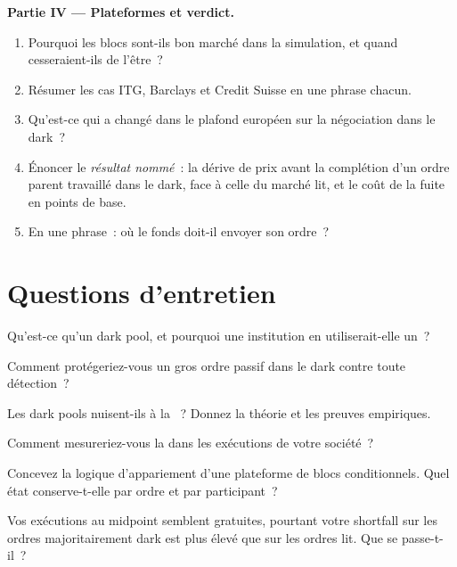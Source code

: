 \begin{problem}
\medskip\noindent\textbf{Partie IV --- Plateformes et verdict.}
\begin{enumerate}[resume]
\item Pourquoi les blocs sont-ils bon marché dans la simulation, et quand cesseraient-ils de l'être~?
\item Résumer les cas ITG, Barclays et Credit Suisse en une phrase chacun.
\item Qu'est-ce qui a changé dans le plafond européen sur la négociation dans le dark~?
\item Énoncer le \emph{résultat nommé}~: la dérive de prix avant la complétion d'un ordre parent travaillé dans le dark, face à celle du marché lit, et
le coût de la fuite en points de base.
\item En une phrase~: où le fonds doit-il envoyer son ordre~?
\end{enumerate}
\end{problem}

\section{Questions d'entretien}

\begin{interviewq}\label{iq:mx:dark-pools-and-blocks:1}
Qu'est-ce qu'un dark pool, et pourquoi une institution en utiliserait-elle un~?
\end{interviewq}

\begin{interviewq}\label{iq:mx:dark-pools-and-blocks:2}
Comment protégeriez-vous un gros ordre passif dans le dark contre toute détection~?
\end{interviewq}

\begin{interviewq}\label{iq:mx:dark-pools-and-blocks:3}
Les dark pools nuisent-ils à la ~? Donnez la théorie et les preuves empiriques.
\end{interviewq}

\begin{interviewq}\label{iq:mx:dark-pools-and-blocks:4}
Comment mesureriez-vous la  dans les exécutions de votre société~?
\end{interviewq}

\begin{interviewq}\label{iq:mx:dark-pools-and-blocks:5}
Concevez la logique d'appariement d'une plateforme de blocs conditionnels. Quel état conserve-t-elle par ordre et par participant~?
\end{interviewq}

\begin{interviewq}\label{iq:mx:dark-pools-and-blocks:6}
Vos exécutions au midpoint semblent gratuites, pourtant votre shortfall sur les ordres majoritairement dark est plus élevé que sur les ordres lit. Que se passe-t-il~?
\end{interviewq}

